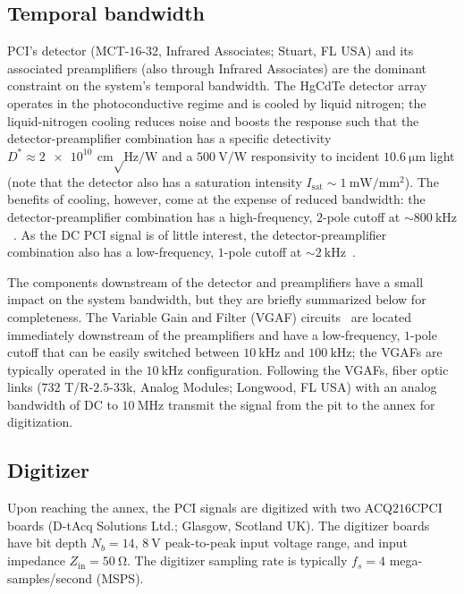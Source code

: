 \subsection{Temporal bandwidth}
\label{sec:Implementation:PCI:temporal_bandwidth}
PCI's detector ({MCT-$16$-$32$}, Infrared Associates; Stuart, FL USA) and
its associated preamplifiers (also through Infrared Associates)
are the dominant constraint on the system's temporal bandwidth.
The HgCdTe detector array
operates in the photoconductive regime and
is cooled by liquid nitrogen;
the liquid-nitrogen cooling reduces noise and boosts the response such that
the detector-preamplifier combination has
a specific detectivity
$D^* \approx \SI{2e10}{\centi\meter \sqrt\hertz \per\watt}$ and
a $\SI{500}{\volt\per\watt}$ responsivity
to incident $\SI{10.6}{\micro\meter}$ light
(note that the detector also has a saturation intensity
$I_{\text{sat}} \sim \SI{1}{\milli\watt \per\milli\meter\squared}$).
The benefits of cooling, however, come at the expense of reduced bandwidth:
the detector-preamplifier combination has
a high-frequency, $2$-pole cutoff
at $\sim \SI{800}{\kilo\hertz}$~\cite{rost_pci_detector_response}.
As the DC PCI signal is of little interest,
the detector-preamplifier combination also has
a low-frequency, $1$-pole cutoff
at $\sim \SI{2}{\kilo\hertz}$~\cite{rost_pci_detector_response}.

The components downstream of the detector and preamplifiers
have a small impact on the system bandwidth, but
they are briefly summarized below for completeness.
The Variable Gain and Filter (VGAF) circuits~\cite[Sec.~3.3.3]{dorris_phd}
are located immediately downstream of the preamplifiers and
have a low-frequency, $1$-pole cutoff that can be easily switched between
$\SI{10}{\kilo\hertz}$ and $\SI{100}{\kilo\hertz}$;
the VGAFs are typically operated in the $\SI{10}{\kilo\hertz}$ configuration.
Following the VGAFs,
fiber optic links ({$732$ T/R-$2.5$-$33$k}, Analog Modules; Longwood, FL USA)
with an analog bandwidth of DC to $\SI{10}{\mega\hertz}$
transmit the signal from the \diiid\space pit to the annex for digitization.


\subsection{Digitizer}
\label{sec:Implementation:PCI:digitizer}
Upon reaching the annex,
the PCI signals are digitized with two
{ACQ$216$CPCI} boards (D-tAcq Solutions Ltd.; Glasgow, Scotland UK).
The digitizer boards have bit depth $N_b = 14$,
$\SI{8}{\volt}$ peak-to-peak input voltage range, and
input impedance $Z_{\text{in}} = \SI{50}{\ohm}$.
The digitizer sampling rate is typically
$f_s = 4$ mega-samples/second (MSPS).


